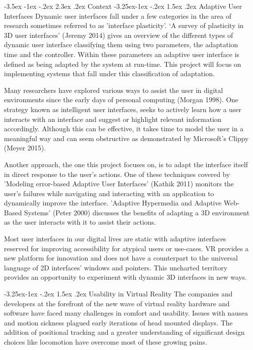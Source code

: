 \documentclass[9pt,twocolumn]{article}
\makeatletter
\renewcommand{\section}{\@startsection {section}{1}{\z@}%
             {-3.5ex \@plus -1ex \@minus -.2ex}%
             {2.3ex \@plus .2ex}%
             {\normalfont\Large\scshape\bfseries}}
\renewcommand{\subsection}{\@startsection{subsection}{2}{\z@}%
             {-3.25ex\@plus -1ex \@minus -.2ex}%
             {1.5ex \@plus .2ex}%
             {\normalfont\large\scshape\bfseries}}
\makeatother
\begin{document}
\section{Context}
\subsection{Adaptive User Interfaces}
Dynamic user interfaces fall under a few categories in the area of research sometimes referred to as 'interface plasticity'. ‘A survey of plasticity in 3D user interfaces' (Jeremy 2014) gives an overview of the different types of dynamic user interface classifying them using two parameters, the adaptation time and the controller. Within these parameters an adaptive user interface is defined as being adapted by the system at run-time. This project will focus on implementing systems that fall under this classification of adaptation.

Many researchers have explored various ways to assist the user in digital environments since the early days of personal computing (Morgan 1998). One strategy known as intelligent user interfaces, seeks to actively learn how a user interacts with an interface and suggest or highlight relevant information accordingly. Although this can be effective, it takes time to model the user in a meaningful way and can seem obstructive as demonstrated by Microsoft's Clippy (Meyer 2015).

Another approach, the one this project focuses on, is to adapt the interface itself in direct response to the user's actions. One of these techniques covered by 'Modeling error-based Adaptive User Interfaces' (Kathik 2011) monitors the user's failures while navigating and interacting with an application to dynamically improve the interface. 'Adaptive Hypermedia and Adaptive Web-Based Systems' (Peter 2000) discusses the benefits of adapting a 3D environment as the user interacts with it to assist their actions.

Most user interfaces in our digital lives are static with adaptive interfaces reserved for improving accessibility for atypical users or use-cases. VR provides a new platform for innovation and does not have a counterpart to the universal language of 2D interfaces' windows and pointers. This uncharted territory provides an opportunity to experiment with dynamic 3D interfaces in new ways.

\subsection{Usability in Virtual Reality}
The companies and developers at the forefront of the new wave of virtual reality hardware and software have faced many challenges in comfort and usability. Issues with nausea and motion sickness plagued early iterations of head mounted displays. The addition of positional tracking and a greater understanding of significant design choices like locomotion have overcome most of these growing pains.
\end{document}

